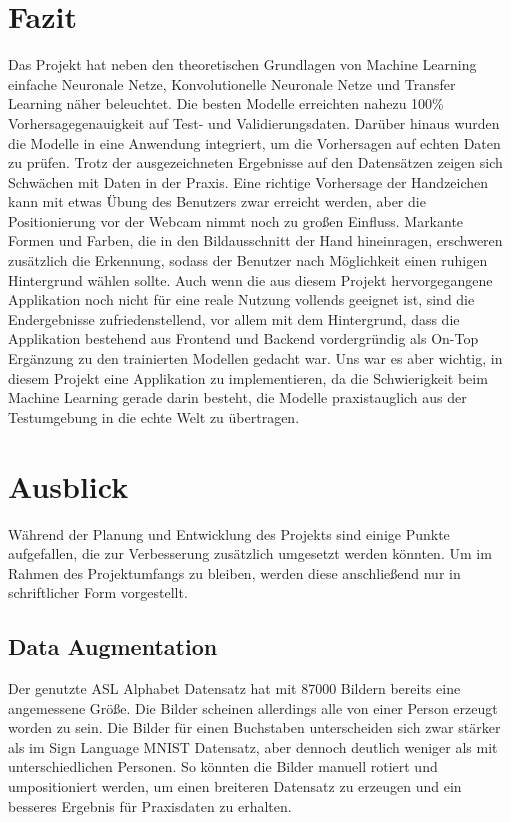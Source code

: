 \documentclass[11pt,bibliography=totocnumbered]{scrartcl}
\begin{document}
\section{Fazit} 
Das Projekt hat neben den theoretischen Grundlagen von Machine Learning einfache Neuronale Netze, Konvolutionelle Neuronale Netze und Transfer Learning näher beleuchtet. Die besten Modelle erreichten nahezu 100\% Vorhersagegenauigkeit auf Test- und Validierungsdaten. Darüber hinaus wurden die Modelle in eine Anwendung integriert, um die Vorhersagen auf echten Daten zu prüfen. Trotz der ausgezeichneten Ergebnisse auf den Datensätzen zeigen sich Schwächen mit Daten in der Praxis. Eine richtige Vorhersage der Handzeichen kann mit etwas Übung des Benutzers zwar erreicht werden, aber die Positionierung vor der Webcam nimmt noch zu großen Einfluss. Markante Formen und Farben, die in den Bildausschnitt der Hand hineinragen, erschweren zusätzlich die Erkennung, sodass der Benutzer nach Möglichkeit einen ruhigen Hintergrund wählen sollte. Auch wenn die aus diesem Projekt hervorgegangene Applikation noch nicht für eine reale Nutzung vollends geeignet ist, sind die Endergebnisse zufriedenstellend, vor allem mit dem Hintergrund, dass die Applikation bestehend aus Frontend und Backend vordergründig als On-Top Ergänzung zu den trainierten Modellen gedacht war. Uns war es aber wichtig, in diesem Projekt eine Applikation zu implementieren, da die Schwierigkeit beim Machine Learning gerade darin besteht, die Modelle praxistauglich aus der Testumgebung in die echte Welt zu übertragen.   
\section{Ausblick}
Während der Planung und Entwicklung des Projekts sind einige Punkte aufgefallen, die zur Verbesserung zusätzlich umgesetzt werden könnten. Um im Rahmen des Projektumfangs zu bleiben, werden diese anschließend nur in schriftlicher Form vorgestellt.
\subsection{Data Augmentation}
Der genutzte ASL Alphabet Datensatz hat mit 87000 Bildern bereits eine angemessene Größe. Die Bilder scheinen allerdings alle von einer Person erzeugt worden zu sein. Die Bilder für einen Buchstaben unterscheiden sich zwar stärker als im Sign Language MNIST Datensatz, aber dennoch deutlich weniger als mit unterschiedlichen Personen. So könnten die Bilder manuell rotiert und umpositioniert werden, um einen breiteren Datensatz zu erzeugen und ein besseres Ergebnis für Praxisdaten zu erhalten.
\end{document}
